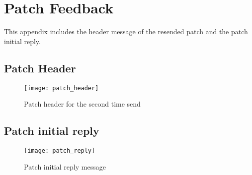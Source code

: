 \chapter{Patch Feedback}

\label{app:feedback}

This appendix includes the header message of the resended patch and the 
patch initial reply.

\section{Patch Header} 

\begin{figure}
\texttt{[image: patch\_header]}
\caption{Patch header for the second time send}
\label{fig:patch_header}
\end{figure}

\section{Patch initial reply}

\begin{figure}
\texttt{[image: patch\_reply]}
\caption{Patch initial reply message}
\label{fig:patch_reply}
\end{figure}
